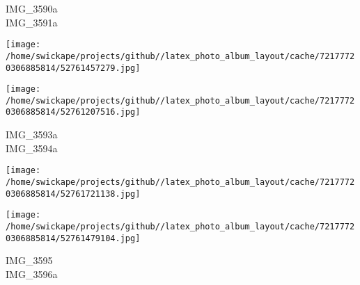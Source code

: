 \documentclass[10pt,letterpaper]{article}
\begin{document}
IMG\_3590a\\
IMG\_3591a
\pagebreak

\texttt{[image: /home/swickape/projects/github//latex\_photo\_album\_layout/cache/72177720306885814/52761457279.jpg]}

\vspace{0.25in}
\texttt{[image: /home/swickape/projects/github//latex\_photo\_album\_layout/cache/72177720306885814/52761207516.jpg]}

IMG\_3593a\\
IMG\_3594a
\pagebreak

\texttt{[image: /home/swickape/projects/github//latex\_photo\_album\_layout/cache/72177720306885814/52761721138.jpg]}

\vspace{0.25in}
\texttt{[image: /home/swickape/projects/github//latex\_photo\_album\_layout/cache/72177720306885814/52761479104.jpg]}

IMG\_3595\\
IMG\_3596a
\pagebreak
\end{document}
